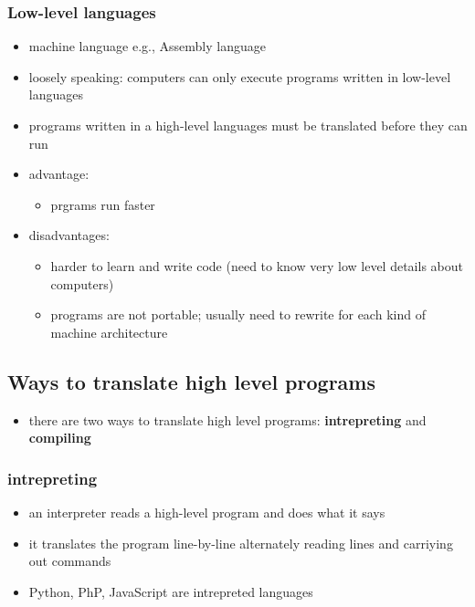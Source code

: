 \documentclass[11pt]{article}
\providecommand{\tightlist}{%
      \setlength{\itemsep}{0pt}\setlength{\parskip}{0pt}}
\begin{document}
\hypertarget{low-level-languages}{%
\subsubsection{Low-level languages}\label{low-level-languages}}

\begin{itemize}
\tightlist
\item
  machine language e.g., Assembly language
\item
  loosely speaking: computers can only execute programs written in
  low-level languages
\item
  programs written in a high-level languages must be translated before
  they can run
\item
  advantage:

  \begin{itemize}
  \tightlist
  \item
    prgrams run faster
  \end{itemize}
\item
  disadvantages:

  \begin{itemize}
  \tightlist
  \item
    harder to learn and write code (need to know very low level details
    about computers)
  \item
    programs are not portable; usually need to rewrite for each kind of
    machine architecture
  \end{itemize}
\end{itemize}

\hypertarget{ways-to-translate-high-level-programs}{%
\subsection{Ways to translate high level
programs}\label{ways-to-translate-high-level-programs}}

\begin{itemize}
\tightlist
\item
  there are two ways to translate high level programs:
  \textbf{intrepreting} and \textbf{compiling}
\end{itemize}

\hypertarget{intrepreting}{%
\subsubsection{intrepreting}\label{intrepreting}}

\begin{itemize}
\tightlist
\item
  an interpreter reads a high-level program and does what it says
\item
  it translates the program line-by-line alternately reading lines and
  carriying out commands
\item
  Python, PhP, JavaScript are intrepreted languages
\end{itemize}
\end{document}
